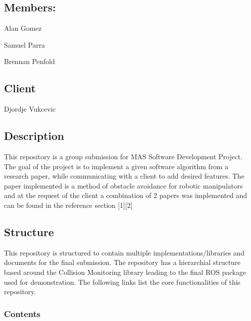 \subsection*{Members\+:}


\begin{DoxyItemize}
\item Alan Gomez
\item Samuel Parra
\item Brennan Penfold
\end{DoxyItemize}

\subsection*{Client}


\begin{DoxyItemize}
\item Djordje Vukcevic
\end{DoxyItemize}

\subsection*{Description}

This repository is a group submission for M\+AS Software Development Project. The goal of the project is to implement a given software algorithm from a research paper, while communicating with a client to add desired features. The paper implemented is a method of obstacle avoidance for robotic manipulators and at the request of the client a combination of 2 papers was implemented and can be found in the reference section \mbox{[}1\mbox{]}\mbox{[}2\mbox{]}

\subsection*{Structure}

This repository is structured to contain multiple implementations/libraries and documents for the final submission. The repository has a hierarchial structure based around the Collision Monitoring library leading to the final R\+OS package used for demonstration. The following links list the core functionalities of this repository.

\subsubsection*{Contents}


